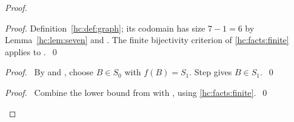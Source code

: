 \begin{mergedproofsection}
\begin{proof}
\begin{proof}
  Definition~\ref{hc:def:graph}; its codomain has size $7-1=6$
  by Lemma~\ref{hc:lem:seven} and .
  The finite bijectivity criterion of \ref{hc:facts:finite}
  applies to .~\qed\end{proof}
 \begin{proof}\pf\ By  and ,
  choose $B\in S_0$ with $f(B)=S_1$. Step 
  gives $B\in S_1$.~\qed\end{proof}
 \qedstep
 \begin{proof}\pf\ Combine the lower bound from
   with , using
  \ref{hc:facts:finite}.~\qed\end{proof}
\end{proof}


\end{mergedproofsection}
